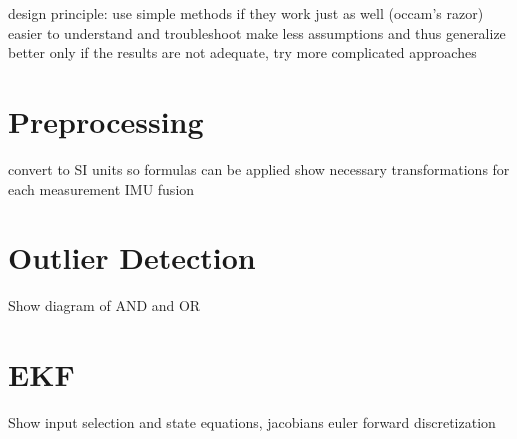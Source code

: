 design principle: use simple methods if they work just as well (occam's razor)
easier to understand and troubleshoot
make less assumptions and thus generalize better
only if the results are not adequate, try more complicated approaches

\section{Preprocessing}
convert to SI units so formulas can be applied
show necessary transformations for each measurement
IMU fusion

\section{Outlier Detection}
Show diagram of AND and OR

\section{EKF}
Show input selection and state equations, jacobians
euler forward discretization
